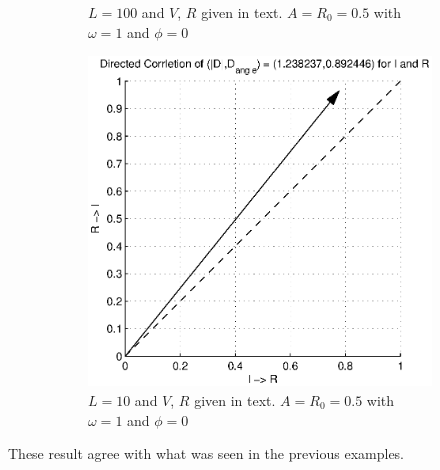 \documentclass[a4paper,11pt]{article}
\begin{document}
\begin{figure}[h!t]
\begin{subfigure}[b]{0.25\textwidth}
\caption{$L = 100$ and $V$, $R$ given in text. $A=R_0=0.5$ with $\omega=1$ and $\phi=0$}
\end{subfigure}
\begin{subfigure}[b]{0.25\textwidth}
\label{fig:RL_Rsin2VsinCCMIR}
\includegraphics[scale=0.4]{graphics/RL_Rsin2VsinCCMIR.eps}
\caption{$L = 10$ and $V$, $R$ given in text. $A=R_0=0.5$ with $\omega=1$ and $\phi=0$}
\end{subfigure}
\caption{}
\end{figure}
These result agree with what was seen in the previous examples.
\end{document}

